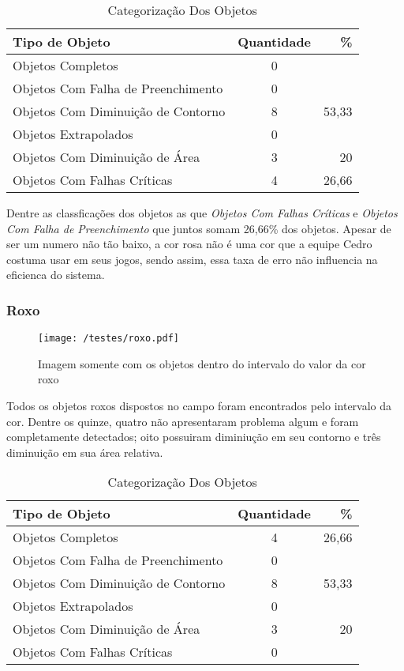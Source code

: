 	\begin{table}[h]
\centering
\begin{tabular}{l|c|r}
Tipo de Objeto & Quantidade  & \% \\ %
\hline                               %
Objetos Completos &  0\\
\hline 
Objetos Com Falha de Preenchimento & 0\\
\hline 
Objetos Com Diminuição de Contorno & 8& 53,33
 \\
\hline 
Objetos Extrapolados & 0 \\
\hline 
Objetos Com Diminuição de Área & 3 & 20\\
\hline 
Objetos Com Falhas Críticas & 4 & 26,66 \\
\hline 
\end{tabular}
\caption{Categorização Dos Objetos}
\end{table}

Dentre as classficações dos objetos as que  \textit{Objetos Com Falhas Críticas} e \textit{Objetos Com Falha de Preenchimento} que juntos somam 26,66\% dos objetos. Apesar de ser um numero não tão baixo, a cor rosa não é uma cor que a equipe Cedro costuma usar em seus jogos, sendo assim, essa taxa de erro não influencia na eficienca do sistema.
\subsubsection{Roxo}
\begin{figure}[H]
		\centering
		\texttt{[image: /testes/roxo.pdf]}
		\caption{Imagem somente com os objetos dentro do intervalo do valor da cor roxo}
		\label{disposicaoparte}
	\end{figure}

Todos os objetos roxos dispostos no campo foram encontrados pelo intervalo da cor. Dentre os quinze, quatro não apresentaram problema algum e foram completamente detectados; oito possuiram diminiução em seu contorno e três diminuição em sua área relativa.
\begin{table}[h]
\centering
\begin{tabular}{l|c|r}
Tipo de Objeto & Quantidade  & \% \\ %
\hline                               %
Objetos Completos &  4 & 26,66\\
\hline 
Objetos Com Falha de Preenchimento & 0 \\
\hline 
Objetos Com Diminuição de Contorno &  8 & 53,33\\
\hline 
Objetos Extrapolados & 0 \\
\hline 
Objetos Com Diminuição de Área & 3 & 20\\
\hline 
Objetos Com Falhas Críticas & 0 \\
\hline 
\end{tabular}
\caption{Categorização Dos Objetos}
\end{table}
	
